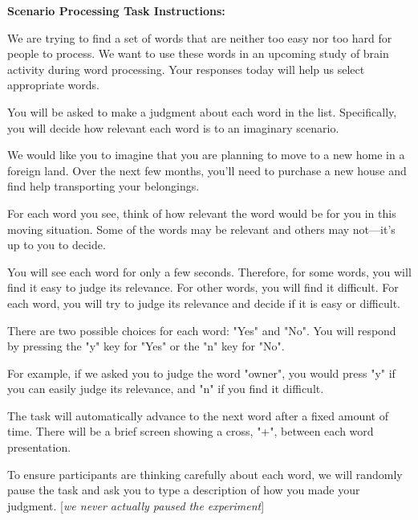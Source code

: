 \documentclass[12pt]{article}
\begin{document}
\textbf{Scenario Processing Task Instructions:}

\begin{displayquote}


We are trying to find a set of words that are neither too easy nor too hard for people to process.
            We want to use these words in an upcoming study of brain activity during word processing.
            Your responses today will help us select appropriate words.

        You will be asked to make a judgment about each word in the list.
            Specifically, you will decide how relevant each word is to an imaginary scenario.

        We would like you to imagine that you are planning to move to a new home in a foreign land.
            Over the next few months, you’ll need to purchase a new house and find help transporting your belongings.

        For each word you see, think of how relevant the word would be for you in this moving situation.
        Some of the words may be relevant and others may not---it’s up to you to decide.


        You will see each word for only a few seconds.
            Therefore, for some words, you will find it easy to judge its relevance.
            For other words, you will find it difficult. For each word, you will try to judge its relevance
            and decide if it is easy or difficult.

        There are two possible choices for each word: "Yes" and "No".
            You will respond by pressing the "y" key for "Yes" or the "n" key for "No".

        For example, if we asked you to judge the word "owner",
            you would press "y" if you can easily judge its relevance, and "n" if you find it difficult.

        The task will automatically advance to the next word after a fixed amount of time.
            There will be a brief screen showing a cross, "+", between each word presentation.

        To ensure participants are thinking carefully about each word, we will
          randomly pause the task and ask you to type a description of how you made your judgment. [\emph{we never actually paused the experiment}]

\end{displayquote}
\end{document}
